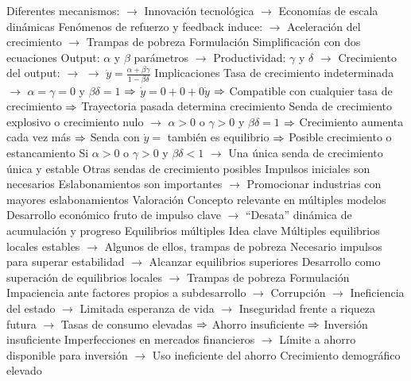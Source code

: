 \documentclass{nuevotema}
\begin{document}
\begin{esquemal}
				\4 Diferentes mecanismos:
				\4[] $\to$ Innovación tecnológica
				\4[] $\to$ Economías de escala dinámicas
				\4 Fenómenos de refuerzo y feedback induce:
				\4[] $\to$ Aceleración del crecimiento
				\4[] $\to$ Trampas de pobreza
			\3 Formulación
				\4 Simplificación con dos ecuaciones
				\4 Output:
				\4[] $\alpha$ y $\beta$ parámetros
				\4[] $\to$ 
				\4 Productividad:
				\4[] $\gamma$ y $\delta$ 
				\4[] $\to$ 
				\4 Crecimiento del output:
				\4[] $\to$ 
				\4[] $\to$ $\dot{y} = \frac{\alpha + \beta \gamma}{1-\beta \delta}$
			\3 Implicaciones
				\4 Tasa de crecimiento indeterminada
				\4[] $\to$ $\alpha=\gamma=0$ y $\beta \delta = 1$
				\4[] $\Rightarrow$ $\dot{y} = 0 + 0 + 0 \dot{y}$
				\4[] $\Rightarrow$ Compatible con cualquier tasa de crecimiento
				\4[] $\Rightarrow$ Trayectoria pasada determina crecimiento
				\4 Senda de crecimiento explosivo o crecimiento nulo
				\4[] $\to$ $\alpha>0$ o $\gamma>0$ y $\beta\delta = 1$
				\4[] $\Rightarrow$ Crecimiento aumenta cada vez más
				\4[] $\Rightarrow$ Senda con $\dot{y}=$ también es equilibrio
				\4[] $\Rightarrow$ Posible crecimiento o estancamiento
				\4 Si $\alpha>0$ o $\gamma >0$ y $\beta \delta < 1$
				\4[] $\to$ Una única senda de crecimiento única y estable
				\4 Otras sendas de crecimiento posibles
				\4[] Impulsos iniciales son necesarios
				\4 Eslabonamientos son importantes
				\4[] $\to$ Promocionar industrias con mayores eslabonamientos
			\3 Valoración
				\4 Concepto relevante en múltiples modelos
				\4 Desarrollo económico fruto de impulso clave
				\4[] $\to$ ``Desata'' dinámica de acumulación y progreso
		\2 Equilibrios múltiples
			\3 Idea clave
				\4 Múltiples equilibrios locales estables
				\4[] $\to$ Algunos de ellos, trampas de pobreza
				\4 Necesario impulsos para superar estabilidad
				\4[] $\to$ Alcanzar equilibrios superiores
				\4 Desarrollo como superación de equilibrios locales
				\4[] $\to$ Trampas de pobreza
			\3 Formulación
				\4 Impaciencia ante factores propios a subdesarrollo
				\4[] $\to$ Corrupción
				\4[] $\to$ Ineficiencia del estado
				\4[] $\to$ Limitada esperanza de vida
				\4[] $\to$ Inseguridad frente a riqueza futura
				\4[] $\to$ Tasas de consumo elevadas
				\4[] $\Rightarrow$ Ahorro insuficiente
				\4[] $\Rightarrow$ Inversión insuficiente
				\4 Imperfecciones en mercados financieros
				\4[] $\to$ Límite a ahorro disponible para inversión
				\4[] $\to$ Uso ineficiente del ahorro
				\4 Crecimiento demográfico elevado

\end{esquemal}
\end{document}
